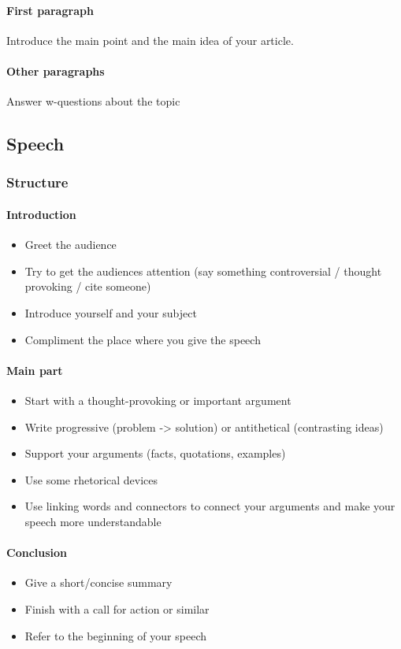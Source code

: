 \documentclass{article}
\begin{document}
	\paragraph{First paragraph}
	Introduce the main point and the main idea of your article.

	\paragraph{Other paragraphs}
	Answer w-questions about the topic

	\subsection{Speech}
	\subsubsection{Structure}
	\paragraph{Introduction}
	\begin{itemize}
		\item Greet the audience
		\item Try to get the audiences attention (say something controversial / thought provoking / cite someone)
		\item Introduce yourself and your subject
		\item Compliment the place where you give the speech
	\end{itemize}

	\paragraph{Main part}
	\begin{itemize}
		\item Start with a thought-provoking or important argument
		\item Write progressive (problem -> solution) or antithetical (contrasting ideas)
		\item Support your arguments (facts, quotations, examples)
		\item Use some rhetorical devices
		\item Use linking words and connectors to connect your arguments and make your speech more understandable
	\end{itemize}

	\paragraph{Conclusion}
	\begin{itemize}
		\item Give a short/concise summary
		\item Finish with a call for action or similar
		\item Refer to the beginning of your speech
	\end{itemize}
\end{document}
